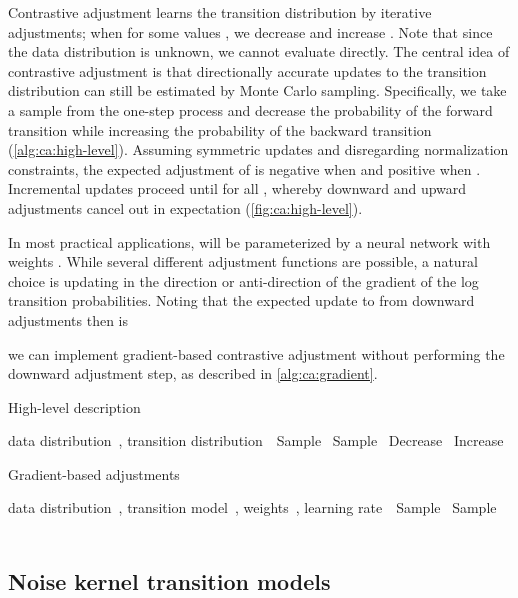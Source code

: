 \documentclass[10pt,twocolumn,letterpaper]{article}
\begin{document}
Contrastive adjustment learns the transition distribution by iterative adjustments;
when  for some values , we decrease  and increase .
Note that since the data distribution  is unknown, we cannot evaluate  directly.
The central idea of contrastive adjustment is that directionally accurate updates to the transition distribution can still be estimated by Monte Carlo sampling.
Specifically, we take a sample from the one-step process  and decrease the probability of the forward transition  while increasing the probability of the backward transition  (\cref{alg:ca:high-level}).
Assuming symmetric updates and disregarding normalization constraints, the expected adjustment of  is negative when  and positive when .
Incremental updates proceed until  for all , whereby downward and upward adjustments cancel out in expectation (\cref{fig:ca:high-level}).

In most practical applications,  will be parameterized by a neural network with weights .
While several different adjustment functions are possible, a natural choice is updating  in the direction or anti-direction of the gradient of the log transition probabilities.
Noting that the expected update to  from downward adjustments then is

we can implement gradient-based contrastive adjustment without performing the downward adjustment step, as described in \cref{alg:ca:gradient}.

\begin{algorithm}[t]
  \caption{High-level description}\label{alg:ca:high-level}
  \begin{algorithmic}
     data distribution~, transition distribution~\REPEAT \STATE~Sample \STATE~Sample \STATE~Decrease \STATE~Increase \end{algorithmic}
\end{algorithm}

\begin{algorithm}[t]
  \caption{Gradient-based adjustments}\label{alg:ca:gradient}
  \begin{algorithmic}
     data distribution~, transition model~, weights~, learning rate~\REPEAT \STATE~Sample \STATE~Sample \STATE~\STATE~\end{algorithmic}
\end{algorithm}


\subsection{Noise kernel transition models}\label{sec:ca:noise-kernel}
\end{document}
